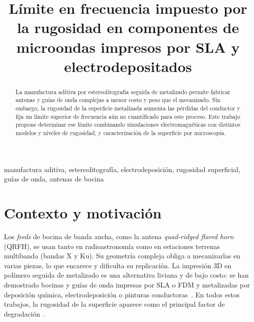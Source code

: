 \documentclass[conference]{IEEEtran}
\begin{document}
\title{Límite en frecuencia impuesto por la rugosidad en componentes de microondas impresos por SLA y electrodepositados}

\author{
}

\maketitle

\begin{abstract}
La manufactura aditiva por estereolitografía seguida de metalizado permite fabricar antenas y guías de onda complejas a menor costo y peso que el mecanizado. Sin embargo, la rugosidad de la superficie metalizada aumenta las pérdidas del conductor y fija un límite superior de frecuencia aún no cuantificado para este proceso. Este trabajo propone determinar ese límite combinando simulaciones electromagnéticas con distintos modelos y niveles de rugosidad, y caracterización de la superficie por microscopía.
\end{abstract}

\begin{IEEEkeywords}
manufactura aditiva, estereolitografía, electrodeposición, rugosidad superficial, guías de onda, antenas de bocina
\end{IEEEkeywords}

\section{Contexto y motivación}
Los \emph{feeds} de bocina de banda ancha, como la antena \emph{quad-ridged flared horn} (QRFH), se usan tanto en radioastronomía como en estaciones terrenas multibanda (bandas X y Ku). Su geometría compleja obliga a mecanizarlas en varias piezas, lo que encarece y dificulta su replicación. La impresión 3D en polímero seguida de metalizado es una alternativa liviana y de bajo costo: se han demostrado bocinas y guías de onda impresas por SLA o FDM y metalizadas por deposición química, electrodeposición o pinturas conductoras~\cite{b1,b2,b3}. En todos estos trabajos, la rugosidad de la superficie aparece como el principal factor de degradación~\cite{b2,b4}.
\end{document}
